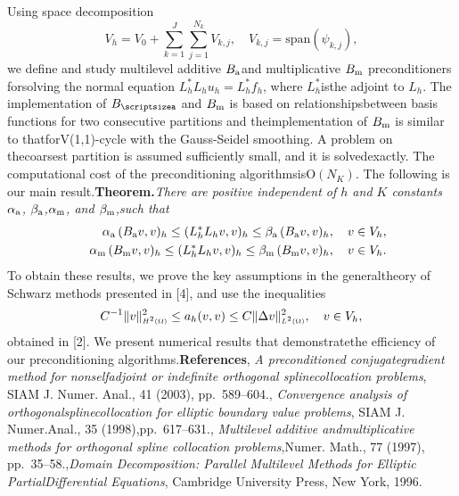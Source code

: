 \documentclass{report}
\begin{document}
Using space decomposition\[V_h=V_0+\sum_{k=1}^{J}\sum_{j=1}^{N_k}V_{k,j},
\quad V_{k,j}= \mbox{span}(\psi_{k,j}),\]we define and study multilevel additive $B_{\textup{\scriptsize a}}$and multiplicative $B_{\textup{\scriptsize m}}$ preconditioners forsolving the normal equation $L_h^*L_hu_h=L_h^*f_h$,
where $L_h^*$isthe adjoint to $L_h$.
The implementation of $B_{\textup{\scriptsizea}}$ and $B_{\textup{\scriptsize m}}$ is based on relationshipsbetween basis functions for two consecutive partitions and theimplementation of $B_{\textup{\scriptsize m}}$ is similar to thatforV(1,1)-cycle with the Gauss-Seidel smoothing.
A problem on thecoarsest partition is assumed sufficiently small,
and it is solvedexactly.
The computational cost of the preconditioning algorithmsis$\mbox{O}(N_K)$.
The following is our main result.\textbf{Theorem.}{\em There are positive independent of $h$ and $K$ constants$\alpha_{\textup{\scriptsize a}}$,
$\beta_{\textup{\scriptsize a}}$,$\alpha_{\textup{\scriptsize m}}$,
and $\beta_{\textup{\scriptsize m}}$,such that}\begin{eqnarray}\label{eq:spectral_equiv}&&\alpha_{\textup{\scriptsize a}}\,
(B_{\textup{\scriptsize a}}v,v)_h\leq (L_h^*L_hv,v)_h \leq\beta_{\textup{\scriptsize a}}\,(B_{\textup{\scriptsize a}}v,v)_h,\quad v\in V_h,\\\nonumber&&\alpha_{\textup{\scriptsize m}}\,(B_{\textup{\scriptsize m}}v,v)_h\leq (L_h^*L_hv,v)_h \leq \beta_{\textup{\scriptsize m}}\,(B_{\textup{\scriptsize m}}v,v)_h,\quad v\in V_h.\end{eqnarray}To obtain these results,
we prove the key assumptions in the generaltheory of Schwarz methods presented in [4],
and use the inequalities\[C^{-1}\|v\|_{\mbox{$\scriptscriptstyle H^{2}(\Omega)$}}^2\leq a_h(v,v)\leq C\|\Delta v\|_{\mbox{$\scriptscriptstyle L^{2}(\Omega)$}}^2,\quad v\in V_h,\]obtained in [2].
We present numerical results that demonstratethe efficiency of our preconditioning algorithms.\bigskip\noindent\textbf{References}\medskip{},
{\em A preconditioned conjugategradient method for nonselfadjoint or indefinite orthogonal splinecollocation problems},
SIAM J.
Numer.
Anal.,
41 (2003),
pp.~589--604.\medskip{},
{\em Convergence analysis of orthogonalsplinecollocation for elliptic boundary value problems},
SIAM J.
Numer.Anal.,
35 (1998),pp.~617--631.\medskip{},
{\em Multilevel additive andmultiplicative methods for orthogonal spline collocation problems},Numer.
Math.,
77 (1997),
pp.~35--58.\medskip{},{\em Domain Decomposition: Parallel Multilevel Methods for Elliptic PartialDifferential Equations},
Cambridge University Press,
New York,
1996.
\end{document}
